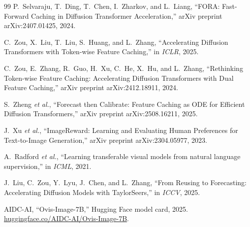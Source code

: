 \documentclass[10pt]{article}
\begin{document}
\begin{thebibliography}{99}
P.~Selvaraju, T.~Ding, T.~Chen, I.~Zharkov, and L.~Liang, ``FORA: Fast-Forward Caching in Diffusion Transformer Acceleration,'' arXiv preprint arXiv:2407.01425, 2024.

C.~Zou, X.~Liu, T.~Liu, S.~Huang, and L.~Zhang, ``Accelerating Diffusion Transformers with Token-wise Feature Caching,'' in \textit{ICLR}, 2025.

C.~Zou, E.~Zhang, R.~Guo, H.~Xu, C.~He, X.~Hu, and L.~Zhang, ``Rethinking Token-wise Feature Caching: Accelerating Diffusion Transformers with Dual Feature Caching,'' arXiv preprint arXiv:2412.18911, 2024.

S.~Zheng \textit{et al.}, ``Forecast then Calibrate: Feature Caching as ODE for Efficient Diffusion Transformers,'' arXiv preprint arXiv:2508.16211, 2025.

J.~Xu \textit{et al.}, ``ImageReward: Learning and Evaluating Human Preferences for Text-to-Image Generation,'' arXiv preprint arXiv:2304.05977, 2023.

A.~Radford \textit{et al.}, ``Learning transferable visual models from natural language supervision,'' in \textit{ICML}, 2021.

J.~Liu, C.~Zou, Y.~Lyu, J.~Chen, and L.~Zhang, ``From Reusing to Forecasting: Accelerating Diffusion Models with TaylorSeers,'' in \textit{ICCV}, 2025.

AIDC-AI, ``Ovis-Image-7B,'' Hugging Face model card, 2025. \href{https://huggingface.co/AIDC-AI/Ovis-Image-7B}{huggingface.co/AIDC-AI/Ovis-Image-7B}.

\end{thebibliography}
\fussy
\end{document}
